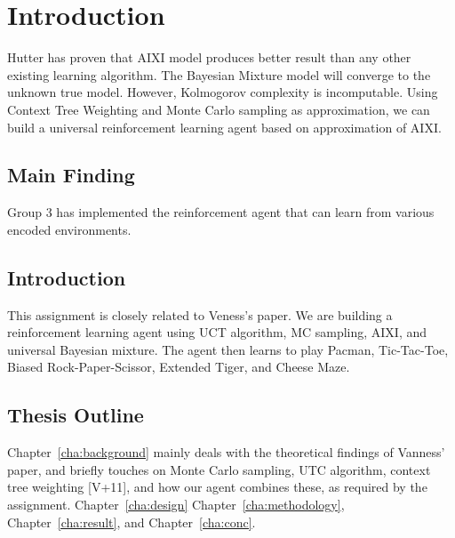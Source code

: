 \chapter{Introduction}
\label{cha:intro}
Hutter has proven that AIXI model produces better result than any other existing learning algorithm. The Bayesian Mixture model will converge to the unknown true model.  However, Kolmogorov complexity is incomputable. Using Context Tree Weighting and Monte Carlo sampling as approximation, we can build a universal reinforcement learning agent based on approximation of AIXI.

\section{Main Finding}
\label{sec:thesisstatement}
Group 3 has implemented the reinforcement agent that can learn from various encoded environments.


\section{Introduction}
\label{sec:problemstatement}
This assignment is closely related to Veness's paper. We are building a reinforcement learning agent using UCT algorithm, MC sampling, AIXI, and universal Bayesian mixture. The agent then learns to play Pacman, Tic-Tac-Toe, Biased Rock-Paper-Scissor, Extended Tiger, and Cheese Maze. 


\section{Thesis Outline}
\label{sec:outline}
Chapter~\ref{cha:background} mainly deals with the theoretical findings of Vanness' paper, and briefly touches on Monte Carlo sampling, UTC algorithm, context tree weighting [V+11], and how our agent combines these, as required by the assignment.
Chapter~\ref{cha:design}  
Chapter~\ref{cha:methodology},
Chapter~\ref{cha:result}, and Chapter~\ref{cha:conc}.
